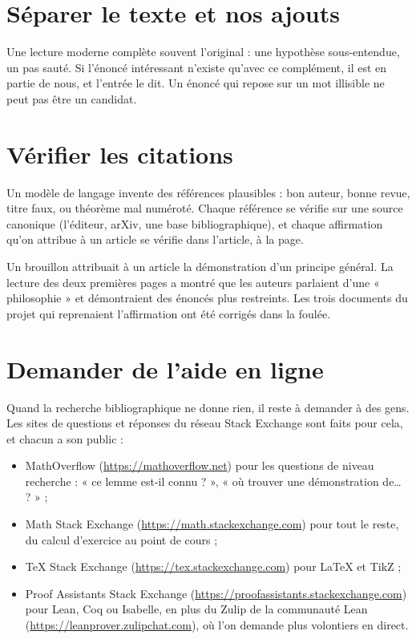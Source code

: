\section{Séparer le texte et nos ajouts}

Une lecture moderne complète souvent l'original : une hypothèse sous-entendue, un pas
sauté. Si l'énoncé intéressant n'existe qu'avec ce complément, il est en partie de nous, et
l'entrée le dit. Un énoncé qui repose sur un mot illisible ne peut pas être un candidat.

\section{Vérifier les citations}

Un modèle de langage invente des références plausibles : bon auteur, bonne revue, titre
faux, ou théorème mal numéroté. Chaque référence se vérifie sur une source canonique
(l'éditeur, arXiv, une base bibliographique), et chaque affirmation qu'on attribue à un
article se vérifie dans l'article, à la page.

\begin{exemple}
Un brouillon attribuait à un article la démonstration d'un principe général. La lecture des
deux premières pages a montré que les auteurs parlaient d'une « philosophie » et
démontraient des énoncés plus restreints. Les trois documents du projet qui reprenaient
l'affirmation ont été corrigés dans la foulée.
\end{exemple}

\section{Demander de l'aide en ligne}

Quand la recherche bibliographique ne donne rien, il reste à demander à des gens. Les sites
de questions et réponses du réseau Stack Exchange sont faits pour cela, et chacun a son
public :
\begin{itemize}
  \item MathOverflow (\url{https://mathoverflow.net}) pour les questions de niveau
        recherche : « ce lemme est-il connu ? », « où trouver une démonstration de… ? » ;
  \item Math Stack Exchange (\url{https://math.stackexchange.com}) pour tout le reste, du
        calcul d'exercice au point de cours ;
  \item TeX Stack Exchange (\url{https://tex.stackexchange.com}) pour LaTeX et TikZ ;
  \item Proof Assistants Stack Exchange (\url{https://proofassistants.stackexchange.com})
        pour Lean, Coq ou Isabelle, en plus du Zulip de la communauté Lean
        (\url{https://leanprover.zulipchat.com}), où l'on demande plus volontiers en
        direct.
\end{itemize}


